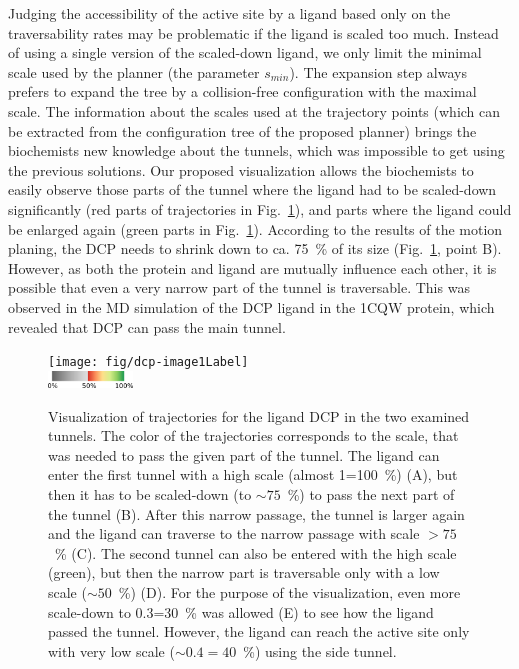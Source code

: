 \documentclass[usletter, 10pt, conference]{ieeeconf} %
\def\smin{s_{min}}
\begin{document}
Judging the accessibility of the active site by a ligand based only on the traversability rates may be problematic if the ligand is scaled too much.
Instead of using a single version of the scaled-down ligand, we only limit the minimal scale used by the planner (the parameter $\smin$).
The expansion step always prefers to expand the tree by a collision-free configuration with the maximal scale.
The information about the scales used at the trajectory points (which can be extracted from the configuration tree of the proposed planner) brings the biochemists new knowledge about the tunnels, which was impossible to get using the previous solutions.
Our proposed visualization allows the biochemists to easily observe those parts of the tunnel where the ligand had to be scaled-down significantly (red parts of trajectories in Fig.~\ref{fig::dcp}), and parts where the ligand could be enlarged again (green parts in Fig.~\ref{fig::dcp}).
According to the results of the motion planing, the DCP needs to shrink down to ca. 75~\% of its size (Fig.~\ref{fig::dcp}, point B).
However, as both the protein and ligand are mutually influence each other, it is possible that even a very narrow part of the tunnel is traversable.
This was observed in the MD simulation of the DCP ligand in the 1CQW protein, which revealed that DCP can pass the main tunnel.

\begin{figure}
\centering
\texttt{[image: fig/dcp-image1Label]}\\
\includegraphics[width=0.2\textwidth]{fig/colormap}
\caption{\label{fig::dcp}
Visualization of trajectories for the ligand DCP in the two examined tunnels.  
The color of the trajectories corresponds to the scale, that was needed to pass the given part of the tunnel.
The ligand can enter the first tunnel with a high scale (almost 1=100~\%) (A), but then it has to be scaled-down (to $\sim75$~\%) to pass the
next part of the tunnel (B). After this narrow passage, the tunnel is larger again and the ligand can traverse to the narrow passage with
scale $>75$~\% (C).
The second tunnel can also be entered with the high scale (green), but then the narrow part is traversable only with a low scale ($\sim50$~\%) (D). 
For the purpose of the visualization, even more scale-down to 0.3=30~\% was allowed (E) to see how the ligand passed the tunnel.
However, the ligand can reach the active site only with very low scale ($\sim0.4=40$~\%) using the side tunnel.
}
\end{figure}
\end{document}
